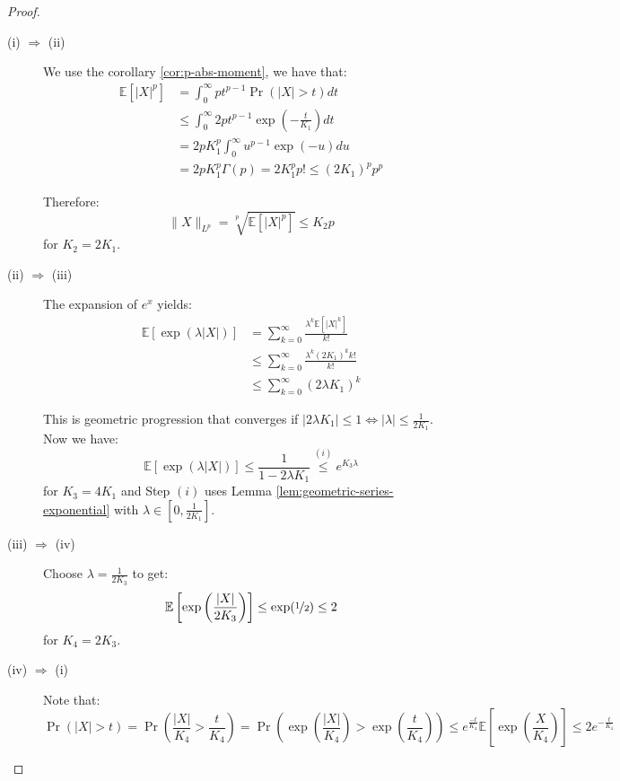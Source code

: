 \documentclass{article}
\theoremstyle{remark}
\newcommand{\Exp}{\mathbb{E}}
\begin{document}
\begin{proof}
\begin{description}
\item [(i) \(\Rightarrow\) (ii)] We use the corollary \ref{cor:p-abs-moment}, we have that:
\begin{align*}
\Exp[|X|^{p}] &= \int_{0}^{\infty} pt^{p-1}\Pr(|X| > t) dt \\
&\leq \int_{0}^{\infty} 2pt^{p-1}\exp\left(-\frac{t}{K_{1}}\right) dt \\
&= 2pK_{1}^{p}\int_{0}^{\infty} u^{p-1}\exp(-u) du \\
&= 2pK_{1}^{p} \Gamma(p) = 2K_{1}^{p} p! \leq (2K_{1})^{p} p^{p}
\end{align*}

Therefore:
\begin{equation*}
\|X\|_{L^{p}} = \sqrt[p]{\Exp[|X|^{p}]} \leq K_{2} p
\end{equation*}
for \(K_{2} = 2K_{1}\).

\item [(ii) \(\Rightarrow\) (iii)] The expansion of \(e^{x}\) yields:
\begin{align*}
\Exp[\exp(\lambda |X|)] &= \sum_{k=0}^{\infty} \frac{\lambda^{k} \Exp[|X|^{k}]}{k!} \\
&\leq \sum_{k=0}^{\infty} \frac{\lambda^{k} (2K_{1})^{k} k!}{k!} \\
&\leq \sum_{k=0}^{\infty} (2\lambda K_{1})^{k}
\end{align*}

This is geometric progression that converges if \(|2\lambda K_{1}| \leq 1 \Leftrightarrow |\lambda| \leq \frac{1}{2K_{1}}\). Now we have:
\begin{equation*}
\Exp[\exp(\lambda |X|)] \leq \frac{1}{1 - 2\lambda K_{1}} \overset{(i)}\leq e^{K_{3}\lambda}
\end{equation*}
for \(K_{3} = 4K_{1}\) and Step \((i)\) uses Lemma \ref{lem:geometric-series-exponential} with \(\lambda \in \left[0, \frac{1}{2K_{1}}\right]\).

\item [(iii) \(\Rightarrow\) (iv)] Choose \(\lambda = \frac{1}{2K_{3}}\) to get:
\begin{equation*}
\Exp\left[\exp\left(\frac{|X|}{2K_{3}}\right)\right] \leq \exp(\nicefrac{1}{2}) \leq 2
\end{equation*}
for \(K_{4} = 2K_{3}\).

\item [(iv) \(\Rightarrow\) (i)] Note that:
\begin{equation*}
\Pr(|X| > t) = \Pr\left(\frac{|X|}{K_{4}} > \frac{t}{K_{4}}\right) = \Pr\left(\exp\left(\frac{|X|}{K_{4}}\right) > \exp\left(\frac{t}{K_{4}}\right)\right) \leq e^{\frac{-t}{K_{4}}}\Exp\left[\exp\left(\frac{X}{K_{4}}\right)\right] \leq 2e^{-\frac{t}{K_{4}}}
\end{equation*}


\end{description}
\end{proof}
\end{document}
